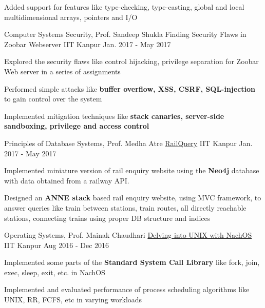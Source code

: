 \begin{cventries}
{\begin{cvitems}
        \item {Added support for features like type-checking, type-casting, global and local multidimensional arrays, pointers and I/O}
      \end{cvitems}
    }
  \cventry
    {Computer Systems Security, Prof. Sandeep Shukla}
    {Finding Security Flaws in Zoobar Webserver}
    {IIT Kanpur}
    {Jan. 2017 - May 2017}
    {
      \begin{cvitems}
        \item {Explored the security flaws like control hijacking, privilege separation for Zoobar Web server in a series of assignments}
        \item {Performed simple attacks like \textbf{buffer overflow, XSS, CSRF, SQL-injection} to gain control over the system}
        \item {Implemented mitigation techniques like \textbf{stack canaries, server-side sandboxing, privilege and access control}}
      \end{cvitems}
    }
  \cventry
    {Principles of Database Systems, Prof. Medha Atre}
    {\href{https://github.com/tulsyan/railquery}{RailQuery}}
    {IIT Kanpur}
    {Jan. 2017 - May 2017}
    {
      \begin{cvitems}
      \item {Implemented miniature version of rail enquiry website using the \textbf{Neo4j} database with data obtained from a railway API.}
        \item {Designed an \textbf{ANNE stack} based rail enquiry website, using MVC framework, to answer queries like train between stations, train routes, all directly reachable stations, connecting trains using proper DB structure and indices}
      \end{cvitems}
    }
  \cventry
    {Operating Systems, Prof. Mainak Chaudhari}
    {\href{https://bitbucket.org/arhamchopra11/nachos-assignments}{Delving into UNIX with NachOS}}
    {IIT Kanpur}
    {Aug 2016 - Dec 2016}
    {
      \begin{cvitems}
        \item {Implemented some parts of the \textbf{Standard System Call Library} like fork, join, exec, sleep, exit, etc. in NachOS}
        \item {Implemented and evaluated performance of process scheduling algorithms like UNIX, RR, FCFS, etc in varying workloads}

\end{cvitems}}
\end{cventries}

